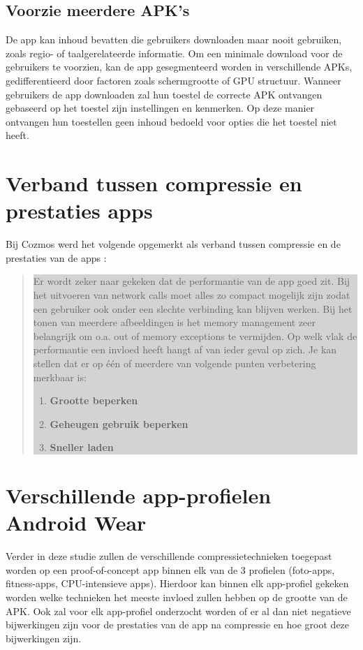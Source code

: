 \subsection{Voorzie meerdere APK's}
\label{sec:multipleapks}
De app kan inhoud bevatten die gebruikers downloaden maar nooit gebruiken, zoals regio- of taalgerelateerde informatie. Om een minimale download voor de gebruikers te voorzien, kan de app gesegmenteerd worden in verschillende APKs, gedifferentieerd door factoren zoals schermgrootte of GPU structuur.
Wanneer gebruikers de app downloaden zal hun toestel de correcte APK ontvangen gebaseerd op het toestel zijn instellingen en kenmerken. Op deze manier ontvangen hun toestellen geen inhoud bedoeld voor opties die het toestel niet heeft.


\section{Verband tussen compressie en prestaties apps}
\label{sec:verbandcompressieprestaties}
Bij Cozmos werd het volgende opgemerkt als verband tussen compressie en de prestaties van de apps :
\begin{quote}
\colorbox{lightgray}{\parbox{350px}{Er wordt zeker naar gekeken dat de performantie van de app goed zit. Bij het uitvoeren van network calls moet alles zo compact mogelijk zijn zodat een gebruiker ook onder een slechte verbinding kan blijven werken. Bij het tonen van meerdere afbeeldingen is het memory management zeer belangrijk om o.a. out of memory exceptions te vermijden. Op welk vlak de performantie een invloed heeft hangt af van ieder geval op zich. Je kan stellen dat er op één of meerdere van volgende punten verbetering merkbaar is: \begin{enumerate}
			\item \textbf{Grootte beperken}
			\item \textbf{Geheugen gebruik beperken}
			\item \textbf{Sneller laden}
		\end{enumerate}
}}
\end{quote}

\section{Verschillende app-profielen Android Wear}
Verder in deze studie zullen de verschillende compressietechnieken toegepast worden op een proof-of-concept app binnen elk van de 3 profielen (foto-apps, fitness-apps, CPU-intensieve apps). Hierdoor kan binnen elk app-profiel gekeken worden welke technieken het meeste invloed zullen hebben op de grootte van de APK. Ook zal voor elk app-profiel onderzocht worden of er al dan niet negatieve bijwerkingen zijn voor de prestaties van de app na compressie en hoe groot deze bijwerkingen zijn. 
